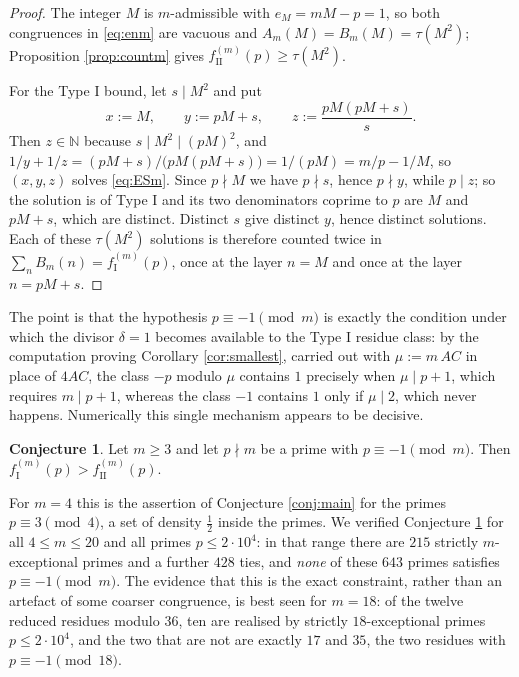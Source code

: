 \documentclass[11pt,reqno]{amsart}
\theoremstyle{plain}
\theoremstyle{definition}
\newtheorem{conjecture}[theorem]{Conjecture}
\numberwithin{equation}{section}
\newcommand{\N}{\mathbb{N}}
\newcommand{\fI}{f_{\mathrm{I}}}
\newcommand{\fII}{f_{\mathrm{II}}}
\begin{document}
\begin{proof}
The integer $M$ is $m$-admissible with $e_{M}=mM-p=1$, so both congruences in
\eqref{eq:enm} are vacuous and $A_{m}(M)=B_{m}(M)=\tau(M^{2})$; Proposition
\ref{prop:countm} gives $\fII^{(m)}(p)\ge\tau(M^{2})$.

For the Type I bound, let $s\mid M^{2}$ and put
\[
  x:=M,\qquad y:=pM+s,\qquad z:=\frac{pM(pM+s)}{s} .
\]
Then $z\in\N$ because $s\mid M^{2}\mid (pM)^{2}$, and
$1/y+1/z=(pM+s)/\bigl(pM(pM+s)\bigr)=1/(pM)=m/p-1/M$, so $(x,y,z)$ solves
\eqref{eq:ESm}. Since $p\nmid M$ we have $p\nmid s$, hence $p\nmid y$, while $p\mid z$;
so the solution is of Type I and its two denominators coprime to $p$ are $M$ and
$pM+s$, which are distinct. Distinct $s$ give distinct $y$, hence distinct solutions.
Each of these $\tau(M^{2})$ solutions is therefore counted twice in
$\sum_{n}B_{m}(n)=\fI^{(m)}(p)$, once at the layer $n=M$ and once at the layer
$n=pM+s$.
\end{proof}

The point is that the hypothesis $p\equiv-1\pmod m$ is exactly the condition under
which the divisor $\delta=1$ becomes available to the Type I residue class: by
the computation proving Corollary \ref{cor:smallest}, carried out with
$\mu:=m\,AC$ in place of $4AC$, the class $-p$ modulo $\mu$ contains $1$ precisely when
$\mu\mid p+1$, which requires $m\mid p+1$, whereas the class $-1$ contains $1$ only if
$\mu\mid2$, which never happens. Numerically this single
mechanism appears to be decisive.

\begin{conjecture}\label{conj:gm}
Let $m\ge3$ and let $p\nmid m$ be a prime with $p\equiv-1\pmod m$. Then
$\fI^{(m)}(p)>\fII^{(m)}(p)$.
\end{conjecture}

For $m=4$ this is the assertion of Conjecture \ref{conj:main} for the primes
$p\equiv3\pmod4$, a set of density $\tfrac12$ inside the primes. We verified
Conjecture \ref{conj:gm} for all $4\le m\le20$ and all primes $p\le2\cdot10^{4}$:
in that range there are $215$ strictly $m$-exceptional primes and a further $428$
ties, and \emph{none} of these $643$ primes satisfies $p\equiv-1\pmod m$. The evidence that this is the exact constraint, rather than an
artefact of some coarser congruence, is best seen for $m=18$: of the twelve reduced
residues modulo $36$, ten are realised by strictly $18$-exceptional primes
$p\le2\cdot10^{4}$, and the two that are not are exactly $17$ and $35$, the two
residues with $p\equiv-1\pmod{18}$.
\end{document}
